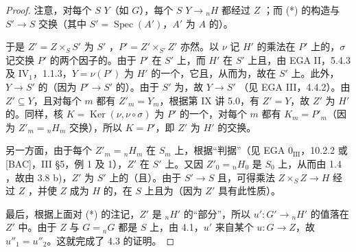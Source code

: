\begin{proof}
注意，对每个 $S$  $Y$（如 $G$），每个 $S$  $Y\to{}_nH$ 都经过 $Z$ ；而 (*) 的构造与 $S'\to S$ 交换（其中 $S'=\operatorname{Spec}(A')$，$A'$ 为 $A$ 的）。

于是 $Z'=Z\times_S S'$ 为 $S'$ ，$P'=Z'\times_{S'}Z'$ 亦然。以 $\nu$ 记 $H'$ 的乘法在 $P'$ 上的，$\sigma$ 记交换 $P'$ 的两个因子的。由于 $P'$ 在 $S'$ 上，而 $H'$ 在 $S'$ 上且，由 EGA II，5.4.3 及 IV$_1$，1.1.3，$Y=\nu(P')$ 为 $H'$ 的一个，它且，从而为，故在 $S'$ 上。此外，$Y\to S'$ 的（因为 $P'\to S'$ 的）。由于 $S'$ 为，故 $Y\to S'$ （见 EGA III，4.4.2）。由 $Z'\subseteq Y$，且对每个 $m$ 都有 $Z'_m=Y_m$，根据第 IX 讲 5.0，有 $Z'=Y$，故 $Z'$ 为 $H'$ 的。同样，核 $K=\operatorname{Ker}(\nu,\nu\circ\sigma)$ 为 $P'$ 的一个，对每个 $m$ 都有 $K_m=P'_m$（因为 $Z'_m={}_nH_m$ 交换），所以 $K=P'$，即 $Z'$ 为 $H'$ 的交换。

另一方面，由于每个 $Z'_m={}_nH_m$ 在 $S_m$ 上，根据“判据”（见 EGA 0$_{\mathrm{III}}$，10.2.2 或 [BAC]，III §5，例 1 及 1），$Z'$ 在 $S'$ 上。又因 $Z'_0={}_nH_0$ 是 $S_0$ 上，从而由 1.4 ，故由 3.8 b)，$Z'$ 为 $S'$ 上的（且）。由于 $S'\to S$ 且，可得乘法 $Z\times_S Z\to H$ 经过 $Z$ ，并使 $Z$ 成为 $H$ 的，在 $S$ 上且为（因为 $Z'$ 具有此性质）。

最后，根据上面对 (*) 的注记，$Z'$ 是 ${}_nH'$ 的“部分”，所以 $u':G'\to{}_nH'$ 的值落在 $Z'$ 中。由于 $Z$ 与 $G={}_nG$ 都是 $S$ 上，由 4.1，$u'$ 来自某个 $u:G\to Z$，故 $u''_1=u''_2$。这就完成了 4.3 的证明。
\end{proof}
